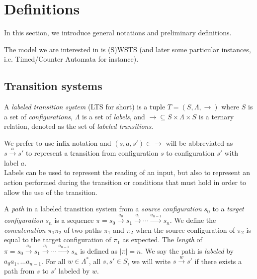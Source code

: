 
\section{Definitions}\label{section definitions}



In this section, we introduce general notations and preliminary definitions.

The model we are interested in is (S)WSTS (and later some particular instances, i.e. Timed/Counter Automata for instance).




\subsection{Transition systems}


\begin{definition}
A {\em labeled transition system} (LTS for short) is a tuple $T=(S, \Lambda, \rightarrow)$ where 
$S$ is a set of {\em configurations}, $ \Lambda$ is a set of {\em labels}, and 
${\rightarrow} \subseteq S\times \Lambda \times S$ is a 
ternary relation,
denoted as the set of {\em labeled transitions}. 
\end{definition}

We
 prefer to use infix notation and $(s,a ,s')\in {\rightarrow} $ will be abbreviated as
       $s  \xrightarrow{a}  s'$
to represent a transition from configuration $s$ to configuration $s'$ with label $a$. \\

\noindent
Labels can be used to represent the reading of an input, but also to represent an action performed during the transition or conditions that must hold in order to allow the use of the transition.


A {\em path} in a labeled transition system from a {\em source configuration} $s_0$
to a {\em target configuration} $s_n$ is a sequence 
$\pi = s_0 \xrightarrow{a_0 } s_1 \xrightarrow{a_1 } \cdots \xrightarrow{a_{n-1} } s_n$. 
We define the {\em concatenation} $ \pi_1 \pi_2$ of 
two paths $\pi_1$ and $\pi_2$ when the source configuration of $\pi_2$ is equal to the target configuration of $\pi_1$
as expected.
The {\em length} of 
$\pi = s_0 \xrightarrow{a_0 } s_1 \xrightarrow{a_1 } \cdots \xrightarrow{a_{n-1} } s_n$
is defined as $|\pi|=n$. We say the path is {\em labeled} by $a_0 a_1 , \ldots a_{n-1}$.
For all $w \in \Lambda^*$, all $s,s' \in S$, we will write $s \xrightarrow{w } s'$ if there exists a path from $s$ to $s'$ labeled by $w$. 

